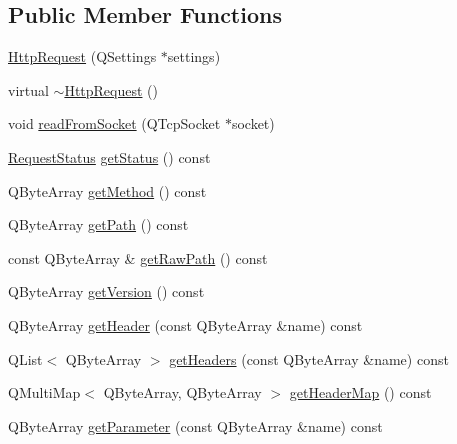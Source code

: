 \subsection*{Public Member Functions}
\begin{DoxyCompactItemize}
\item 
\mbox{\hyperlink{classstefanfrings_1_1_http_request_a948b749ba225459dad7514630897cca8}{Http\+Request}} (Q\+Settings $\ast$settings)
\item 
virtual \mbox{\hyperlink{classstefanfrings_1_1_http_request_adfc7ae561e6ba03d21890ee1855df72b}{$\sim$\+Http\+Request}} ()
\item 
void \mbox{\hyperlink{classstefanfrings_1_1_http_request_a87e7ca425b96545e062454f66e346caf}{read\+From\+Socket}} (Q\+Tcp\+Socket $\ast$socket)
\item 
\mbox{\hyperlink{classstefanfrings_1_1_http_request_a45b0d7b99dbbb1b2c62afd8f51887995}{Request\+Status}} \mbox{\hyperlink{classstefanfrings_1_1_http_request_a1e53a0d5566400eae00e47b819a26c30}{get\+Status}} () const
\item 
Q\+Byte\+Array \mbox{\hyperlink{classstefanfrings_1_1_http_request_ae3c92d9c0f5279c6d5b1bfdb47aaa5e0}{get\+Method}} () const
\item 
Q\+Byte\+Array \mbox{\hyperlink{classstefanfrings_1_1_http_request_a9e9f87cc06cdeae2ca03c97d576c217b}{get\+Path}} () const
\item 
const Q\+Byte\+Array \& \mbox{\hyperlink{classstefanfrings_1_1_http_request_ad472e46e79a5bfc676f5670f3655009b}{get\+Raw\+Path}} () const
\item 
Q\+Byte\+Array \mbox{\hyperlink{classstefanfrings_1_1_http_request_adfd550673eb70a6477b0c04eb2023bad}{get\+Version}} () const
\item 
Q\+Byte\+Array \mbox{\hyperlink{classstefanfrings_1_1_http_request_a490265254cf6ad8b642205aef325d4da}{get\+Header}} (const Q\+Byte\+Array \&name) const
\item 
Q\+List$<$ Q\+Byte\+Array $>$ \mbox{\hyperlink{classstefanfrings_1_1_http_request_ac59f41dbdc579cc1827427d6e77303af}{get\+Headers}} (const Q\+Byte\+Array \&name) const
\item 
Q\+Multi\+Map$<$ Q\+Byte\+Array, Q\+Byte\+Array $>$ \mbox{\hyperlink{classstefanfrings_1_1_http_request_a14a7f04cbe53ffc8d54c9b21fbd55704}{get\+Header\+Map}} () const
\item 
Q\+Byte\+Array \mbox{\hyperlink{classstefanfrings_1_1_http_request_ad231eca50e6a0cba6b01c5093542447e}{get\+Parameter}} (const Q\+Byte\+Array \&name) const
\item 

\end{DoxyCompactItemize}

